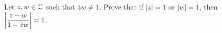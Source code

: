 \question Let $z,w\in\mathbb{C}$ such that $\bar z w \neq 1$.
Prove that if $|z|=1$ or $|w|=1$, then $\abs{\dfrac{z-w}{1 - \bar z w}}=1$.


